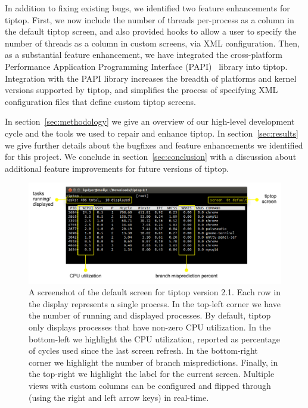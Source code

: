In addition to fixing existing bugs, we identified two feature enhancements for tiptop.
First, we now include the number of threads per-process as a column in the default tiptop screen, and also provided hooks to allow a user to specify the number of threads as a column in custom screens, via XML configuration.
Then, as a substantial feature enhancement, we have integrated the cross-platform Performance Application Programming Interface (PAPI)~\cite{Mucci99papi:a} library into tiptop.
Integration with the PAPI library increases the breadth of platforms and kernel versions supported by tiptop, and simplifies the process of specifying XML configuration files that define custom tiptop screens.

In section~\ref{sec:methodology} we give an overview of our high-level development cycle and the tools we used to repair and enhance tiptop.
In section~\ref{sec:results} we give further details about the bugfixes and feature enhancements we identified for this project.
We conclude in section~\ref{sec:conclusion} with a discussion about additional feature improvements for future versions of tiptop.

\begin{figure}[t]
\footnotesize
\centering
\includegraphics[width=1\textwidth]{tiptop-default}
\caption{A screenshot of the default screen for tiptop version 2.1. Each row in the display represents a single process.
In the top-left corner we have the number of running and displayed processes.
By default, tiptop only displays processes that have non-zero CPU utilization.
In the bottom-left we highlight the CPU utilization, reported as percentage of cycles used since the last screen refresh.
In the bottom-right corner we highlight the number of branch mispredictions.
Finally, in the top-right we highlight the label for the current screen.
Multiple views with custom columns can be configured and flipped through (using the right and left arrow keys) in real-time.}
\label{fig:tiptop-default}
\end{figure}